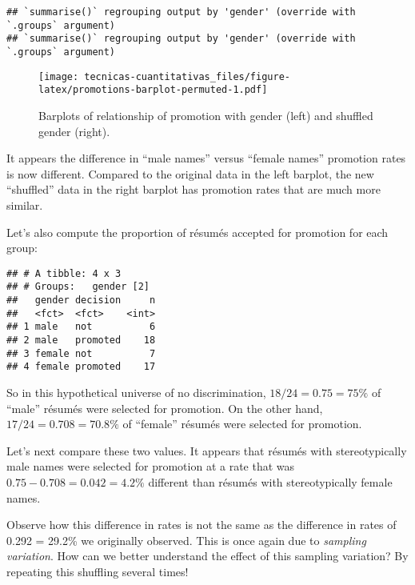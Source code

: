 \documentclass[
]{book}
\newenvironment{Shaded}{\begin{snugshade}}{\end{snugshade}}
\newcommand{\CommentTok}[1]{\textcolor[rgb]{0.56,0.35,0.01}{\textit{#1}}}
\newcommand{\KeywordTok}[1]{\textcolor[rgb]{0.13,0.29,0.53}{\textbf{#1}}}
\newcommand{\NormalTok}[1]{#1}
\newcommand{\OperatorTok}[1]{\textcolor[rgb]{0.81,0.36,0.00}{\textbf{#1}}}
\newcommand{\StringTok}[1]{\textcolor[rgb]{0.31,0.60,0.02}{#1}}
\begin{document}
\begin{verbatim}
## `summarise()` regrouping output by 'gender' (override with `.groups` argument)
## `summarise()` regrouping output by 'gender' (override with `.groups` argument)
\end{verbatim}

\begin{figure}
\centering
\texttt{[image: tecnicas-cuantitativas\_files/figure-latex/promotions-barplot-permuted-1.pdf]}
\caption{\label{fig:promotions-barplot-permuted}Barplots of relationship of promotion with gender (left) and shuffled gender (right).}
\end{figure}

It appears the difference in ``male names'' versus ``female names'' promotion rates is now different. Compared to the original data in the left barplot, the new ``shuffled'' data in the right barplot has promotion rates that are much more similar.

Let's also compute the proportion of résumés accepted for promotion for each group:

\begin{Shaded}
\end{Shaded}

\begin{verbatim}
## # A tibble: 4 x 3
## # Groups:   gender [2]
##   gender decision     n
##   <fct>  <fct>    <int>
## 1 male   not          6
## 2 male   promoted    18
## 3 female not          7
## 4 female promoted    17
\end{verbatim}

So in this hypothetical universe of no discrimination, \(18/24 = 0.75 = 75\%\) of ``male'' résumés were selected for promotion. On the other hand, \(17/24 = 0.708 = 70.8\%\) of ``female'' résumés were selected for promotion.

Let's next compare these two values. It appears that résumés with stereotypically male names were selected for promotion at a rate that was \(0.75 - 0.708 = 0.042 = 4.2\%\) different than résumés with stereotypically female names.

Observe how this difference in rates is not the same as the difference in rates of 0.292 = 29.2\% we originally observed. This is once again due to \emph{sampling variation}. How can we better understand the effect of this sampling variation? By repeating this shuffling several times!
\end{document}
